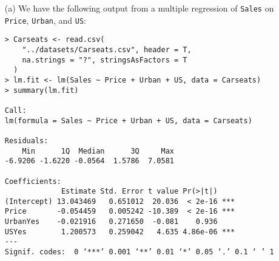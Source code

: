 
\begin{itemize}
    \item[(a)] We have the following output from a multiple regression of \verb|Sales|
        on \verb|Price|, \verb|Urban|, and \verb|US|:
        \small\begin{verbatim}
> Carseats <- read.csv(
    "../datasets/Carseats.csv", header = T, 
    na.strings = "?", stringsAsFactors = T
  )
> lm.fit <- lm(Sales ~ Price + Urban + US, data = Carseats)
> summary(lm.fit)

Call:
lm(formula = Sales ~ Price + Urban + US, data = Carseats)

Residuals:
    Min      1Q  Median      3Q     Max 
-6.9206 -1.6220 -0.0564  1.5786  7.0581 

Coefficients:
             Estimate Std. Error t value Pr(>|t|)    
(Intercept) 13.043469   0.651012  20.036  < 2e-16 ***
Price       -0.054459   0.005242 -10.389  < 2e-16 ***
UrbanYes    -0.021916   0.271650  -0.081    0.936    
USYes        1.200573   0.259042   4.635 4.86e-06 ***
---
Signif. codes:  0 ‘***’ 0.001 ‘**’ 0.01 ‘*’ 0.05 ‘.’ 0.1 ‘ ’ 1


\end{verbatim}
\end{itemize}
